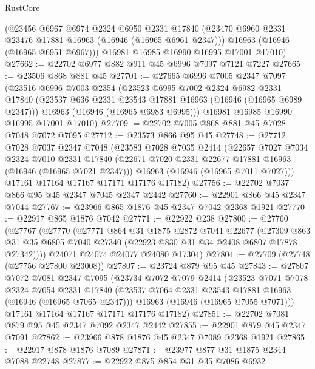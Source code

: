 \begin{lexlean}{RustCore}
\begin{coremodule}
      (@23456
        @6967
        @6974
        @2324
        @6950
        @2331
        @17840
        (@23470 @6960 @2331 @23476 @17881 @16963 (@16946 (@16965 @6961 @2347)))
        @16963
        (@16946 (@16965 @6951 @6967)))
      @16981
      @16985
      @16990
      @16995
      @17001
      @17010)
@27662 := @22702 @6977 @882 @911 @45 @6996 @7097 @7121 @7227
@27665 := @23506 @868 @881 @45
@27701 := @27665
    @6996
    @7005
    @2347
    @7097
    (@23516
      @6996
      @7003
      @2354
      (@23523
        @6995
        @7002
        @2324
        @6982
        @2331
        @17840
        (@23537 @636 @2331 @23543 @17881 @16963 (@16946 (@16965 @6989 @2347)))
        @16963
        (@16946 (@16965 @6983 @6995)))
      @16981
      @16985
      @16990
      @16995
      @17001
      @17010)
@27709 := @22702 @7005 @868 @881 @45 @7028 @7048 @7072 @7095
@27712 := @23573 @866 @95 @45
@27748 := @27712
    @7028
    @7037
    @2347
    @7048
    (@23583
      @7028
      @7035
      @2414
      (@22657
        @7027
        @7034
        @2324
        @7010
        @2331
        @17840
        (@22671 @7020 @2331 @22677 @17881 @16963 (@16946 (@16965 @7021 @2347)))
        @16963
        (@16946 (@16965 @7011 @7027)))
      @17161
      @17164
      @17167
      @17171
      @17176
      @17182)
@27756 := @22702 @7037 @866 @95 @45 @2347 @7045 @2347 @2442
@27760 := @22901 @866 @45 @2347 @7044
@27767 := @23966 @865 @1876 @45 @2347 @7042 @2368 @1921
@27770 := @22917 @865 @1876 @7042
@27771 := @22922 @238
@27800 := @27760
    (@27767
      (@27770
        (@27771
          @864
          @31
          @1875
          @2872
          @7041
          @22677
          (@27309 @863 @31 @35 @6805 @7040 @27340 (@22923 @830 @31 @34 @2408 @6807 @17878 @27342))))
      @24071
      @24074
      @24077
      @24080
      @17304)
@27804 := @27709 (@27748 (@27756 @27800 @23008))
@27807 := @23724 @879 @95 @45
@27843 := @27807
    @7072
    @7081
    @2347
    @7095
    (@23734
      @7072
      @7079
      @2414
      (@23523
        @7071
        @7078
        @2324
        @7054
        @2331
        @17840
        (@23537 @7064 @2331 @23543 @17881 @16963 (@16946 (@16965 @7065 @2347)))
        @16963
        (@16946 (@16965 @7055 @7071)))
      @17161
      @17164
      @17167
      @17171
      @17176
      @17182)
@27851 := @22702 @7081 @879 @95 @45 @2347 @7092 @2347 @2442
@27855 := @22901 @879 @45 @2347 @7091
@27862 := @23966 @878 @1876 @45 @2347 @7089 @2368 @1921
@27865 := @22917 @878 @1876 @7089
@27871 := @23977 @877 @31 @1875 @2344 @7088 @22748
@27877 := @22922 @875 @854 @31 @35 @7086 @6932

\end{coremodule}
\end{lexlean}
